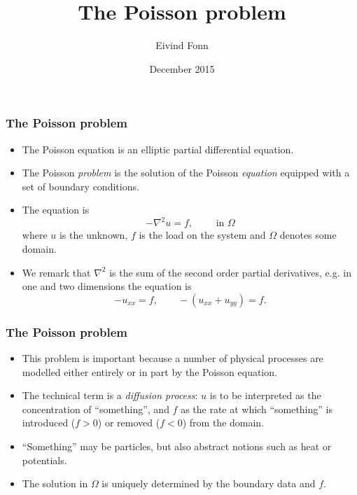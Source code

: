 

\title{The Poisson problem}
\author{Eivind Fonn}
\date{December 2015}
\maketitle

\begin{frame}
  \frametitle{The Poisson problem}
  \begin{itemize}
  \item The Poisson equation is an elliptic partial differential equation.
  \item The Poisson \emph{problem} is the solution of the Poisson
    \emph{equation} equipped with a set of boundary conditions.
  \item The equation is
    \[
      -\nabla^2 u = f, \qquad \text{ in } \Omega
    \]
    where $u$ is the unknown, $f$ is the load on the system and $\Omega$ denotes
    some domain.
  \item We remark that $\nabla^2$ is the sum of the second order partial
    derivatives, e.g. in one and two dimensions the equation is
    \[
      -u_{xx} = f, \qquad -\left( u_{xx} + u_{yy} \right) = f.
    \]
  \end{itemize}
\end{frame}

\begin{frame}[fragile]
  \frametitle{The Poisson problem}
  \begin{itemize}
  \item This problem is important because a number of physical processes are
    modelled either entirely or in part by the Poisson equation.
  \item The technical term is a \emph{diffusion process}: $u$ is to be
    interpreted as the concentration of ``something'', and $f$ as the rate at
    which ``something'' is introduced ($f > 0$) or removed ($f < 0$) from the
    domain.
  \item ``Something'' may be particles, but also abstract notions such as heat
    or potentials.
  \item The solution in $\Omega$ is uniquely determined by the boundary data and
    $f$.
  \end{itemize}
\end{frame}

